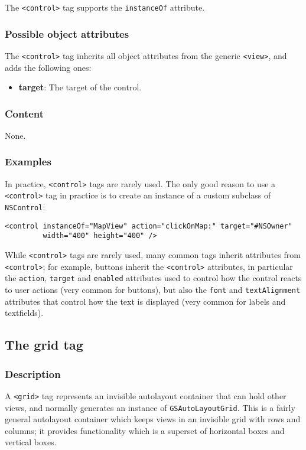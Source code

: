 The \texttt{<control>} tag supports the \texttt{instanceOf} attribute.

\subsubsection{Possible object attributes}
The \texttt{<control>} tag inherits all object attributes from the
generic \texttt{<view>}, and adds the following ones:
\begin{itemize}
\item {\bf target}: The target of the control.
\end{itemize}

\subsubsection{Content}
None.

\subsubsection{Examples}
In practice, \texttt{<control>} tags are rarely used.  The only good
reason to use a \texttt{<control>} tag in practice is to create an
instance of a custom subclass of \texttt{NSControl}:
\begin{verbatim}
<control instanceOf="MapView" action="clickOnMap:" target="#NSOwner" 
         width="400" height="400" />
\end{verbatim}

While \texttt{<control>} tags are rarely used, many common tags
inherit attributes from \texttt{<control>}; for example, buttons
inherit the \texttt{<control>} attributes, in particular the
\texttt{action}, \texttt{target} and \texttt{enabled} attributes used
to control how the control reacts to user actions (very common for
buttons), but also the \texttt{font} and \texttt{textAlignment}
attributes that control how the text is displayed (very common for
labels and textfields).

\subsection{The grid tag}

\subsubsection{Description}
A \texttt{<grid>} tag represents an invisible autolayout container
that can hold other views, and normally generates an instance of
\texttt{GSAutoLayoutGrid}.  This is a fairly general autolayout
container which keeps views in an invisible grid with rows and
columns; it provides functionality which is a superset of horizontal
boxes and vertical boxes.

